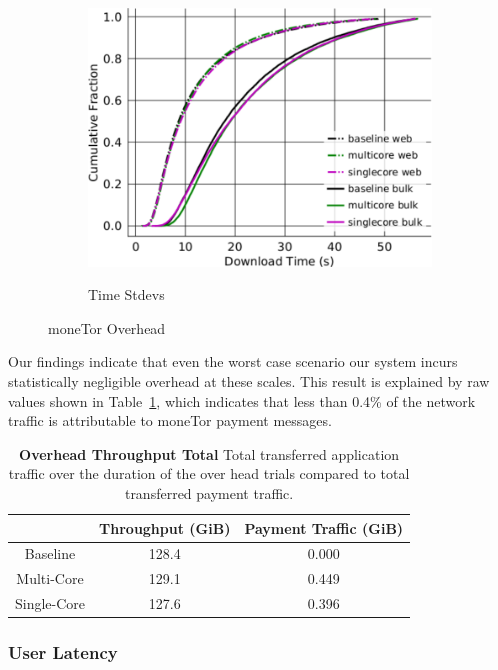 \begin{figure}
\begin{subfigure}[t]{0.32\textwidth}
\includegraphics[trim={0 3cm 0 3cm}, clip, width=1.0\textwidth]{images/overhead_downloadtime.pdf}
		\label{fig:stats_c}
		\caption{Time Stdevs}
	\end{subfigure}
	\label{fig:measurements}
	\caption{moneTor Overhead}
\end{figure}

Our findings indicate that even the worst case scenario our system incurs
statistically negligible overhead at these scales. This result is explained by
raw values shown in Table~\ref{tab:overhead}, which indicates that less than
0.4\% of the network traffic is attributable to moneTor payment messages.

\begin{table}
  \caption[Overhead Throughput Total]{\textbf{Overhead Throughput Total} Total
    transferred application traffic over the duration of the over head trials
    compared to total transferred payment traffic.}
  \begin{center}
    \begin{tabular}{ c c c }
      & Throughput (GiB) & Payment Traffic (GiB) \\ \hline
      Baseline & 128.4 & 0.000 \\
      Multi-Core & 129.1 & 0.449 \\
      Single-Core & 127.6 & 0.396
    \end{tabular}
  \end{center}
  \label{tab:overhead}
\end{table}

\subsubsection{User Latency}

